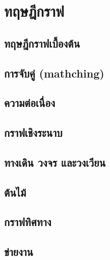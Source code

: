 \chapter{ทฤษฎีกราฟ}
\section{ทฤษฎีกราฟเบื้องต้น}
\section{การจับคู่ (mathching)}
\section{ความต่อเนื่อง}
\section{กราฟเชิงระนาบ}
\section{ทางเดิน วงจร และวงเวียน}
\section{ต้นไม้}
\section{กราฟทิศทาง}
\section{ข่ายงาน}
~